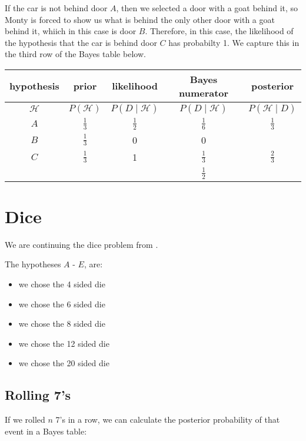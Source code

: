 \documentclass[a5paper,11pt]{article}
\begin{document}
If the car is not behind door $A$, then  we
selected a door with a goat behind it, so
Monty is forced to show us what is behind
the only other door with a goat behind
it, whiich in this case is door $B$. 
Therefore, in this case, the likelihood
of the hypothesis that the car is
behind door $C$ has probabilty 1. We
capture this in the third row of the
Bayes table below.
\begin{center}
\begin{tabular}{ | c | c | c | c  | c | }
    \hline
    hypothesis & prior & likelihood & Bayes numerator & posterior\\ \hline
    $\mathcal{H}$ & $P\left(\mathcal{H}\right)$ & $P\left(D \mid \mathcal{H}\right)$ & $P\left(D \mid \mathcal{H} \right)$ & $P\left(\mathcal{H} \mid D \right)$ \\ \hline
    $A$ & $\frac{1}{3}$ & $\frac{1}{2}$ & $\frac{1}{6}$  & $\frac{1}{3}$ \\ \hline
    $B$ & $\frac{1}{3}$ & 0           & 0   &  \\ \hline
    $C$ & $\frac{1}{3}$ & 1 & $\frac{1}{3}$& $\frac{2}{3}$ \\ \hline
    &  &  & $\frac{1}{2}$ &  \\ \hline
  \end{tabular}
\end{center}

\section{Dice}

We are continuing the dice problem from \cite{reading12b}.

The hypotheses $A$ - $E$, are:
\begin{itemize}
\item we chose the 4 sided die
\item we chose the 6 sided die
\item we chose the 8 sided die
\item we chose the 12 sided die
\item we chose the 20 sided die
\end{itemize}

\subsection{Rolling 7's}
If we rolled $n$ 7's in a row, we can calculate the posterior probability of
that event in a Bayes table:
\end{document}
